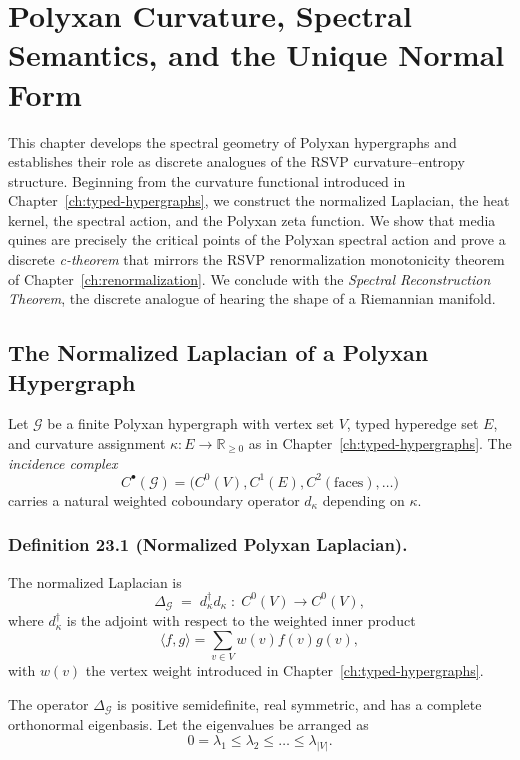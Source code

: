 \chapter{Polyxan Curvature, Spectral Semantics, and the Unique Normal Form}
\label{ch:polyxan-spectral}

This chapter develops the spectral geometry of Polyxan hypergraphs and establishes
their role as discrete analogues of the RSVP curvature--entropy structure.
Beginning from the curvature functional introduced in Chapter~\ref{ch:typed-hypergraphs},
we construct the normalized Laplacian, the heat kernel, the spectral action, and the
Polyxan zeta function.  
We show that media quines are precisely the critical points of the Polyxan spectral action
and prove a discrete \emph{c-theorem} that mirrors the RSVP renormalization 
monotonicity theorem of Chapter~\ref{ch:renormalization}.  
We conclude with the \emph{Spectral Reconstruction Theorem}, the discrete analogue of
hearing the shape of a Riemannian manifold.

\section{The Normalized Laplacian of a Polyxan Hypergraph}

Let $\mathcal{G}$ be a finite Polyxan hypergraph with vertex set $V$, 
typed hyperedge set $E$, and curvature assignment 
$\kappa : E \to \mathbb{R}_{\ge 0}$ as in Chapter~\ref{ch:typed-hypergraphs}.
The \emph{incidence complex}
\[
C^\bullet(\mathcal{G}) = \big(C^0(V), C^1(E), C^2(\mathrm{faces}), \ldots \big)
\]
carries a natural weighted coboundary operator $d_\kappa$ depending on $\kappa$.

\subsection*{Definition 23.1 (Normalized Polyxan Laplacian).}
The normalized Laplacian is
\[
\Delta_{\mathcal{G}}
 \;=\;
d_\kappa^\dagger d_\kappa 
\;:\;
C^{0}(V) \to C^{0}(V),
\]
where $d_\kappa^\dagger$ is the adjoint with respect to the weighted inner product
\[
\langle f, g \rangle 
= \sum_{v\in V} w(v) f(v) g(v),
\]
with $w(v)$ the vertex weight introduced in Chapter~\ref{ch:typed-hypergraphs}.

The operator $\Delta_{\mathcal{G}}$ is positive semidefinite, real symmetric, and has a
complete orthonormal eigenbasis.  
Let the eigenvalues be arranged as
\[
0 = \lambda_1 \le \lambda_2 \le \dots \le \lambda_{|V|}.
\]

